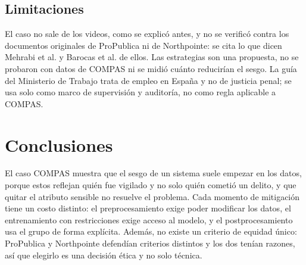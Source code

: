 \documentclass[11pt,letterpaper]{article}
\begin{document}
\subsection{Limitaciones}

El caso no sale de los videos, como se explicó antes, y no se verificó contra los documentos originales de ProPublica ni de Northpointe: se cita lo que dicen Mehrabi et al. y Barocas et al. de ellos. Las estrategias son una propuesta, no se probaron con datos de COMPAS ni se midió cuánto reducirían el sesgo. La guía del Ministerio de Trabajo trata de empleo en España y no de justicia penal; se usa solo como marco de supervisión y auditoría, no como regla aplicable a COMPAS.

\section{Conclusiones}

El caso COMPAS muestra que el sesgo de un sistema suele empezar en los datos, porque estos reflejan quién fue vigilado y no solo quién cometió un delito, y que quitar el atributo sensible no resuelve el problema. Cada momento de mitigación tiene un costo distinto: el preprocesamiento exige poder modificar los datos, el entrenamiento con restricciones exige acceso al modelo, y el postprocesamiento usa el grupo de forma explícita. Además, no existe un criterio de equidad único: ProPublica y Northpointe defendían criterios distintos y los dos tenían razones, así que elegirlo es una decisión ética y no solo técnica.

\end{document}
